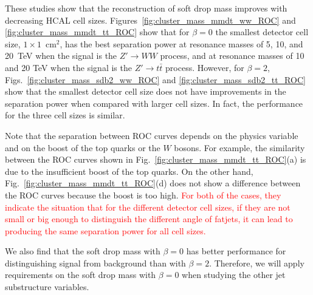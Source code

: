 These studies show that the reconstruction of soft drop mass improves with decreasing  HCAL cell sizes.
Figures~\ref{fig:cluster_mass_mmdt_ww_ROC} and 
\ref{fig:cluster_mass_mmdt_tt_ROC} show that for $\beta=0$ the 
smallest detector cell size, 
$1\times1$~cm$^2$, has the best separation power at 
resonance masses of 5, 10, and 20~TeV when the signal is the $Z' \rightarrow WW$ process,  and 
at  resonance masses of 10 and 20 TeV when the signal is the $Z' \rightarrow t\bar{t}$ process.
However, for $\beta=2$, Figs.~\ref{fig:cluster_mass_sdb2_ww_ROC} and \ref{fig:cluster_mass_sdb2_tt_ROC} 
show that the smallest detector cell size 
does not have improvements in the separation power when compared with 
larger cell sizes. In fact, the performance for the three cell sizes is  
similar. 

Note that the separation between ROC curves depends 
on the physics variable and on the boost of the top quarks or the $W$ bosons. For example, 
the similarity between the ROC curves shown in Fig.~\ref{fig:cluster_mass_mmdt_tt_ROC}(a)
is due to the insufficient boost of the top quarks.
On the other hand, Fig.~\ref{fig:cluster_mass_mmdt_tt_ROC}(d) does not show a difference 
between the ROC curves because the boost is too high.
 \textcolor{red}{For both of the cases, they indicate the situation that for the different detector cell sizes, if they are not small or big enough to distinguish the different angle of fatjets, it can lead to producing the same separation power for all cell sizes.}

We also find that the  soft drop mass with $\beta=0$ has better 
performance for distinguishing signal from background than with  $\beta=2$. Therefore, we will 
apply requirements on the soft drop mass with $\beta=0$  when studying the other jet substructure 
variables. 
 

